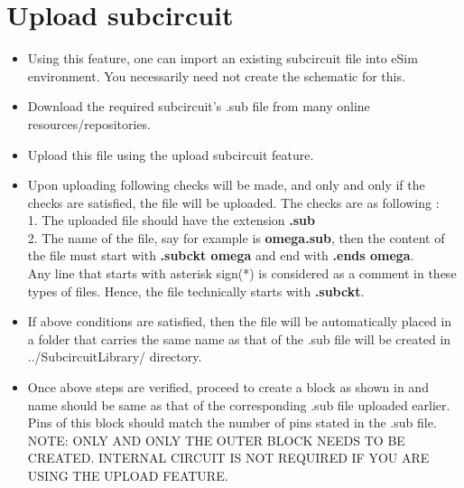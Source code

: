 \section{Upload subcircuit}
\begin{itemize}
    \item Using this feature, one can import an existing subcircuit file into eSim environment. You necessarily need not create the schematic for this.
    \item Download the required subcircuit's .sub file from many online resources/repositories. 
    \item Upload this file using the upload subcircuit feature.
    \item Upon uploading following checks will be made, and only and only if the checks are satisfied, the file will be uploaded. The checks are as following : \\
    1. The uploaded file should have the extension \textbf{.sub} \\
    2. The name of the file, say for example is \textbf{omega.sub}, then the content of the file must start with \textbf{.subckt omega} and end with \textbf{.ends omega}. \\
    Any line that starts with asterisk sign(*) is considered as a comment in these types of files. Hence, the file technically starts with \textbf{.subckt}.
    \item If above conditions are satisfied, then the file will be automatically placed in a folder that carries the same name as that of the .sub file will be created in ../SubcircuitLibrary/ directory.
    \item Once above steps are verified, proceed to create a block as shown in  and name should be same as that of the corresponding .sub file uploaded earlier. Pins of this block should match the number of pins stated in the .sub file. \\
    NOTE: ONLY AND ONLY THE OUTER BLOCK NEEDS TO BE CREATED. INTERNAL CIRCUIT IS NOT REQUIRED IF YOU ARE USING THE UPLOAD FEATURE.
    
\end{itemize}

